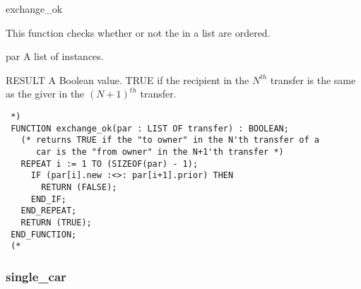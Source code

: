 \documentclass{article}
\begin{document}
 \begin{Mnamedesc}{exchange_ok}

 \begin{Mdesctext}

 This function checks whether or not the  in a list are
 ordered.

 \end{Mdesctext}

 \begin{Ipars}

 \item[par] A list of  instances.

 \item[RESULT] A Boolean value. TRUE if the recipient in the $N^{th}$ transfer
 is the same as the giver in the $(N+1)^{th}$ transfer.

 \end{Ipars}

 \begin{Mexp}
 \begin{verbatim}
 *)
 FUNCTION exchange_ok(par : LIST OF transfer) : BOOLEAN;
   (* returns TRUE if the "to owner" in the N'th transfer of a 
      car is the "from owner" in the N+1'th transfer *) 
   REPEAT i := 1 TO (SIZEOF(par) - 1);
     IF (par[i].new :<>: par[i+1].prior) THEN
       RETURN (FALSE);
     END_IF;
   END_REPEAT;
   RETURN (TRUE);
 END_FUNCTION;
 (*
 \end{verbatim}
 \end{Mexp}
 \end{Mnamedesc}

 \subsubsection{single\_car}
\end{document}

